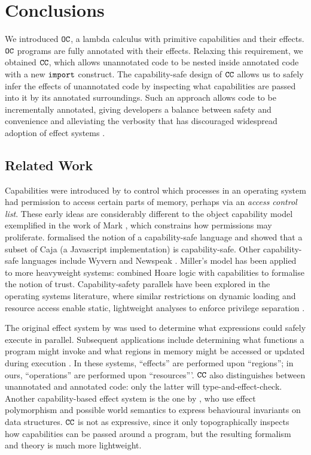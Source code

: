\section{Conclusions}

We introduced $\mathtt{OC}$, a lambda calculus with primitive capabilities and their effects. $\mathtt{OC}$ programs are fully annotated with their effects. Relaxing this requirement, we obtained $\mathtt{CC}$, which allows unannotated code to be nested inside annotated code with a new $\mathtt{import}$ construct. The capability-safe design of $\mathtt{CC}$ allows us to safely infer the effects of unannotated code by inspecting what capabilities are passed into it by its annotated surroundings. Such an approach allows code to be incrementally annotated, giving developers a balance between safety and convenience and alleviating the verbosity that has discouraged widespread adoption of effect systems \cite{rytz12}.

\subsection{Related Work}

Capabilities were introduced by \citet{dennis66} to control which processes in an operating system had permission to access certain parts of memory, perhaps via an \textit{access control list}. These early ideas are considerably different to the object capability model exemplified in the work of Mark \citet{miller06}, which constrains how permissions may proliferate. \citet{maffeis10} formalised the notion of a capability-safe language and showed that a subset of Caja (a Javascript implementation) is capability-safe. Other capability-safe languages include Wyvern \cite{nistor13} and Newspeak \cite{bracha10}. Miller's model has been applied to more heavyweight systems: \citet{drossopoulou07} combined Hoare logic with capabilities to formalise the notion of trust. Capability-safety parallels have been explored in the operating systems literature, where similar restrictions on dynamic loading and resource access \cite{hunt07} enable static, lightweight analyses to enforce privilege separation \cite{madhavapeddy13}.

The original effect system by \citet{lucassen88} was used to determine what expressions could safely execute in parallel. Subsequent applications include determining what functions a program might invoke \cite{tang94} and what regions in memory might be accessed or updated during execution \cite{talpin94}. In these systems, ``effects'' are performed upon ``regions''; in ours, ``operations'' are performed upon ``resources'''. $\mathtt{CC}$ also distinguishes between unannotated and annotated code: only the latter will type-and-effect-check. Another capability-based effect system is the one by \citet{devriese16}, who use effect polymorphism and possible world semantics to express behavioural invariants on data structures. $\mathtt{CC}$ is not as expressive, since it only topographically inspects how capabilities can be passed around a program, but the resulting formalism and theory is much more lightweight.

